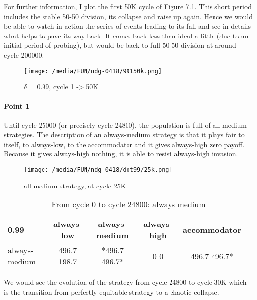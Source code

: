 \documentclass[12.5pt]{report}
\begin{document}
For further information, I plot the first 50K cycle of Figure 7.1. This short period includes the stable 50-50 division, its collapse and raise up again. Hence we would be able to watch in action the series of events leading to its fall and see in details what helps to pave its way back. It comes back less than ideal a little (due to an initial period of probing), but would be back to full 50-50 division at around cycle 200000.

\begin{figure}[h!]
\center
\texttt{[image: /media/FUN/ndg-0418/99150k.png]}
\caption{$\delta$ = 0.99, cycle 1 -> 50K}
\end{figure}

\paragraph{Point 1}

Until cycle 25000 (or precisely cycle 24800), the population is full of all-medium strategies. The description of an always-medium strategy is that it plays fair to itself, to always-low, to the accommodator and it gives always-high zero payoff. Because it gives always-high nothing, it is able to resist always-high invasion.

\begin{figure}[h!]
\center
\texttt{[image: /media/FUN/ndg-0418/dot99/25k.png]}
\caption{all-medium strategy, at cycle 25K}
\end{figure}

\begin{table}[h!]
\center
\begin{tabular}{l|ccccc}
\textbf{0.99}& always-low & always-medium & always-high & accommodator\\
\hline
always-medium  &  496.7 198.7 &  *496.7 496.7*   &    0 0   &     496.7 496.7* \\
\end{tabular}
\caption{From cycle 0 to cycle 24800: always medium}
\end{table}

We would see the evolution of the strategy from cycle 24800 to cycle 30K which is the transition from perfectly equitable strategy to a chaotic collapse.\\
\end{document}
